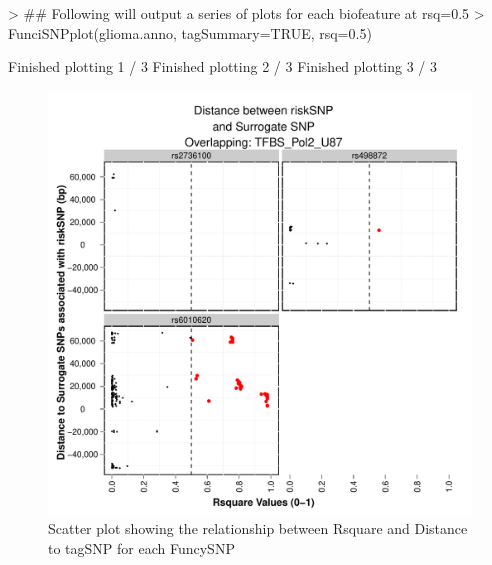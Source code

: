 \documentclass[a4paper]{article}
\begin{document}
\begin{Schunk}
\begin{Sinput}
> ## Following will output a series of plots for each biofeature at rsq=0.5
> FunciSNPplot(glioma.anno, tagSummary=TRUE, rsq=0.5)
\end{Sinput}
\begin{Soutput}
Finished plotting  1 / 3 
Finished plotting  2 / 3 
Finished plotting  3 / 3 
\end{Soutput}
\end{Schunk}
\begin{figure}[ht!]
\begin{center}
\includegraphics{FunciSNP.0.1.7/plots/TFBS_Pol2_U87_R2vsDist_riskSNP.pdf}
\caption{\label{fig:TFBS_Pol2_U87_R2vsDist_riskSNP.pdf} Scatter plot 
showing the relationship between Rsquare and Distance to tagSNP for each 
FuncySNP}
{\footnotesize{}}
\end{center}
\end{figure}
\end{document}
